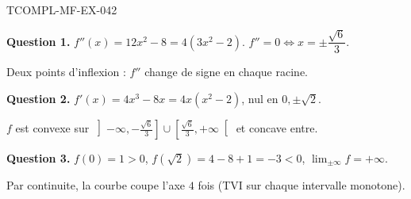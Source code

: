 \begin{corrige}{TCOMPL-MF-EX-042}

\textbf{Question 1.} $f''(x) = 12x^2 - 8 = 4(3x^2-2)$. $f'' = 0 \iff x = \pm\dfrac{\sqrt{6}}{3}$.


Deux points d'inflexion : $f''$ change de signe en chaque racine.

\textbf{Question 2.} $f'(x) = 4x^3 - 8x = 4x(x^2-2)$, nul en $0, \pm\sqrt{2}$.

$f$ est convexe sur $\left]-\infty, -\frac{\sqrt6}{3}\right] \cup \left[\frac{\sqrt6}{3}, +\infty\right[$ et concave entre.

\textbf{Question 3.} $f(0)=1>0$, $f(\sqrt2) = 4-8+1 = -3 < 0$, $\lim_{\pm\infty} f = +\infty$.

Par continuite, la courbe coupe l'axe $4$ fois (TVI sur chaque intervalle monotone).

\end{corrige}
